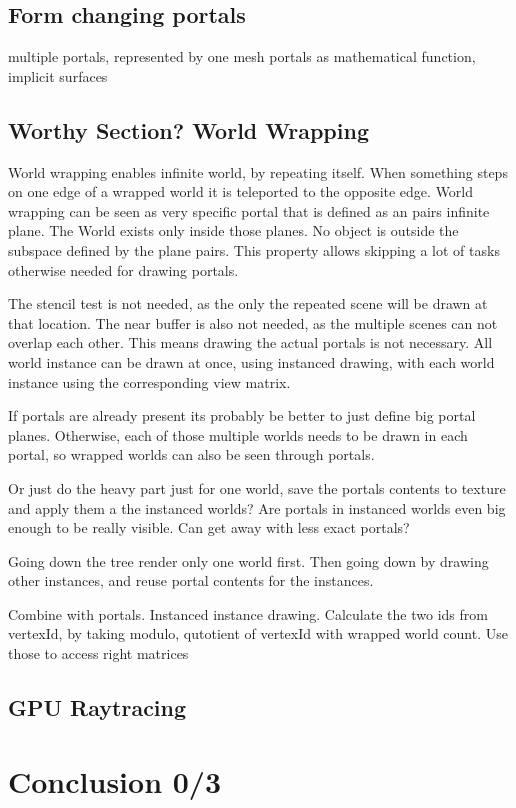 \subsection{Form changing portals}
{multiple portals, represented by one mesh}
{portals as mathematical function, implicit surfaces }


\subsection{Worthy Section? World Wrapping}
World wrapping enables infinite world, by repeating itself. When something steps on one edge of a wrapped world it is teleported to the opposite edge. World wrapping can be seen as very specific portal that is defined as an pairs infinite plane. The World exists only inside those planes. No object is outside the subspace defined by the plane pairs. This property allows skipping a lot of tasks otherwise needed for drawing portals.

The stencil test is not needed, as the only the repeated scene will be drawn at that location. The near buffer is also not needed, as the multiple scenes can not overlap each other. This means drawing the actual portals is not necessary. All world instance can be drawn at once, using instanced drawing, with each world instance using the corresponding view matrix.

If portals are already present its probably be better to just define big portal planes. Otherwise, each of those multiple worlds needs to be drawn in each portal, so wrapped worlds can also be seen through portals. 

Or just do the heavy part just for one world, save the portals contents to texture and apply them a the instanced worlds? Are portals in instanced worlds even big enough to be really visible. Can get away with less exact portals?

Going down the tree render only one world first. Then going down by drawing other instances, and reuse portal contents for the instances.

Combine with portals. Instanced instance drawing. Calculate the two ids from vertexId, by taking modulo, qutotient of vertexId with wrapped world count. Use those to access right matrices


\subsection{GPU Raytracing}
\section{Conclusion 0/3}


